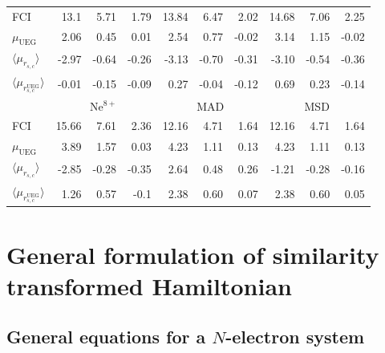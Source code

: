 \documentclass[aip,jcp,reprint,noshowkeys,superscriptaddress]{revtex4-1}
\newcommand{\muueg}{\mu_{\text{UEG}}}
\newcommand{\murscav}{\langle \mu_{r_{s,c}}\rangle}
\newcommand{\mursclda}{\langle \mu_{r_{s,c}^{\text{UEG}}}\rangle}
\begin{document}
\begin{table}
\begin{ruledtabular}
\begin{tabular}{l|rrr||rrr||rrr|}
 FCI         &  13.1   &   5.71   &  1.79    &  13.84  &   6.47   &  2.02   &  14.68  &   7.06   &  2.25    \\  
$\muueg$     &  2.06   &   0.45   &  0.01    &  2.54   &   0.77   & -0.02   &  3.14   &   1.15   & -0.02    \\  
$\murscav$   &  -2.97  &  -0.64   &  -0.26   & -3.13   &  -0.70   & -0.31   & -3.10   &  -0.54   & -0.36    \\  
$\mursclda$  &  -0.01  &  -0.15   &  -0.09   &  0.27   &  -0.04   & -0.12   &  0.69   &   0.23   & -0.14    \\  
\hline
             &\multicolumn{3}{c}{Ne$^{8+}$}  & \multicolumn{3}{c}{MAD} & \multicolumn{3}{c}{MSD}    \\
 FCI         &  15.66  &   7.61   &  2.36    & 12.16   &    4.71  &    1.64   &  12.16   &   4.71   &    1.64   \\   
$\muueg$     &  3.89   &   1.57   &  0.03    & 4.23    &    1.11  &    0.13   &   4.23   &   1.11   &    0.13   \\   
$\murscav$   &  -2.85  &  -0.28   & -0.35    & 2.64    &    0.48  &    0.26   &  -1.21   &  -0.28   &   -0.16   \\   
$\mursclda$  &  1.26   &   0.57   & -0.1     & 2.38    &    0.60  &    0.07   &   2.38   &   0.60   &    0.05   \\   
\end{tabular}
\end{ruledtabular}
\end{table}
\section{General formulation of similarity transformed Hamiltonian}
\subsection{General equations for a $N$-electron system}
\end{document}
